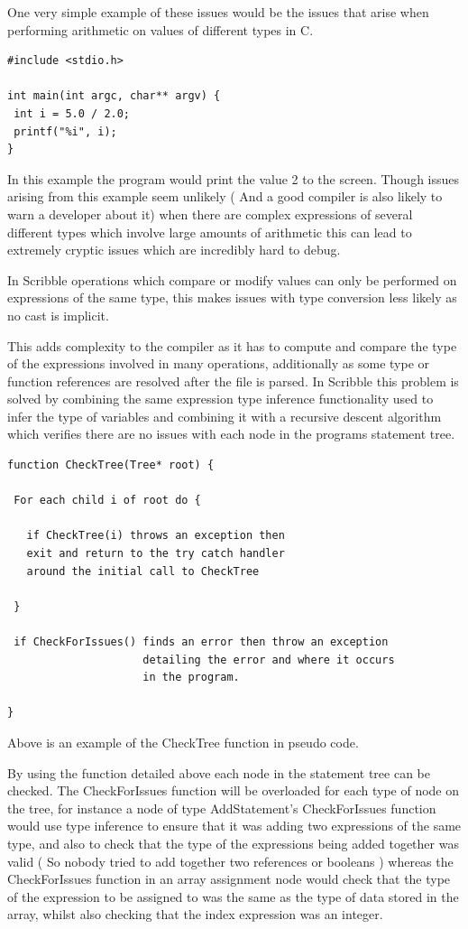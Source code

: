 \documentclass[]{final_report}
\begin{document}
One very simple example of these issues would be the issues that arise when performing arithmetic on values of different types in C.

\begin{verbatim}
#include <stdio.h>

int main(int argc, char** argv) {
 int i = 5.0 / 2.0;
 printf("%i", i);
}
\end{verbatim}

In this example the program would print the value 2 to the screen. Though issues arising from this example seem unlikely ( And a good compiler is also likely to warn a developer about it) when there are complex expressions of several different types which involve large amounts of arithmetic this can lead to extremely cryptic issues which are incredibly hard to debug.

In Scribble operations which compare or modify values can only be performed on expressions of the same type, this makes issues with type conversion less likely as no cast is implicit. 

This adds complexity to the compiler as it has to compute and compare the type of the expressions involved in many operations, additionally as some type or function references are resolved after the file is parsed. In Scribble this problem is solved by combining the same expression type inference functionality used to infer the type of variables and combining it with a recursive descent algorithm which verifies there are no issues with each node in the programs statement tree.

\begin{verbatim}
function CheckTree(Tree* root) {
 
 For each child i of root do {

   if CheckTree(i) throws an exception then 
   exit and return to the try catch handler 
   around the initial call to CheckTree
   
 }
 
 if CheckForIssues() finds an error then throw an exception 
 					 detailing the error and where it occurs 
 					 in the program.

}
\end{verbatim}
Above is an example of the CheckTree function in pseudo code.

By using the function detailed above each node in the statement tree can be checked. The CheckForIssues function will be overloaded for each type of node on the tree, for instance a node of type AddStatement's CheckForIssues function would use type inference to ensure that it was adding two expressions of the same type, and also to check that the type of the expressions being added together was valid ( So nobody tried to add together two references or booleans ) whereas the CheckForIssues function in an array assignment node would check that the type of the expression to be assigned to  was the same as the type of data stored in the array, whilst also checking that the index expression was an integer.
\end{document}
